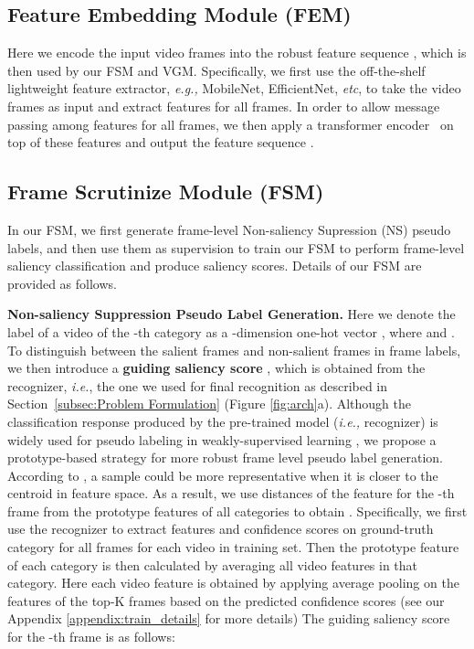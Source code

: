 \documentclass[runningheads]{llncs}
\begin{document}
\subsection{Feature Embedding Module (FEM)}
\label{sec:embed}
Here we encode the input video frames  into the robust feature sequence , which is then used by our FSM and VGM.
Specifically, we first use the off-the-shelf lightweight feature extractor, \textit{e.g.,} MobileNet, EfficientNet, \emph{etc}, to take the video frames as input and extract features for all frames. In order to allow message passing among features for all frames, we then apply a transformer encoder~\cite{transformer} on top of these features and output the feature sequence .
\subsection{Frame Scrutinize Module (FSM)} \label{fsmodule}

In our FSM, we first generate frame-level Non-saliency Supression (NS) pseudo labels, and then use them as supervision to train our FSM to perform frame-level saliency classification and produce saliency scores. Details of our FSM are provided as follows.

\noindent \textbf{Non-saliency Suppression Pseudo Label Generation.}
Here we denote the label of a video of the -th category as a -dimension one-hot vector , where  and . 
To distinguish between the salient frames and non-salient frames in frame labels, we then introduce a \textbf{guiding saliency score} , which is obtained from the recognizer, \emph{i.e.}, the one we used for final recognition as described in Section~\ref{subsec:Problem Formulation} (Figure \ref{fig:arch}a). Although the classification response produced by the pre-trained model (\emph{i.e.,} recognizer) is widely used for pseudo labeling in weakly-supervised learning \cite{wsod_oicr,bgmodel,wsss}, we propose a prototype-based strategy for more robust frame level pseudo label generation.
According to \cite{proto_network,zhang2020discriminability}, a sample could be more representative when it is closer to the centroid in feature space. As a result, we use distances of the feature for the -th frame from the prototype features of all categories to obtain  .
Specifically, we first use the recognizer to extract features and confidence scores on ground-truth category for all frames for each video in training set. Then the prototype feature of each category is then calculated by averaging all video features in that category. Here each video feature is obtained by applying average pooling on the features of the top-K frames based on the predicted confidence scores (see our Appendix \ref{appendix:train_details} for more details)
The guiding saliency score  for the -th frame is as follows:
\end{document}
